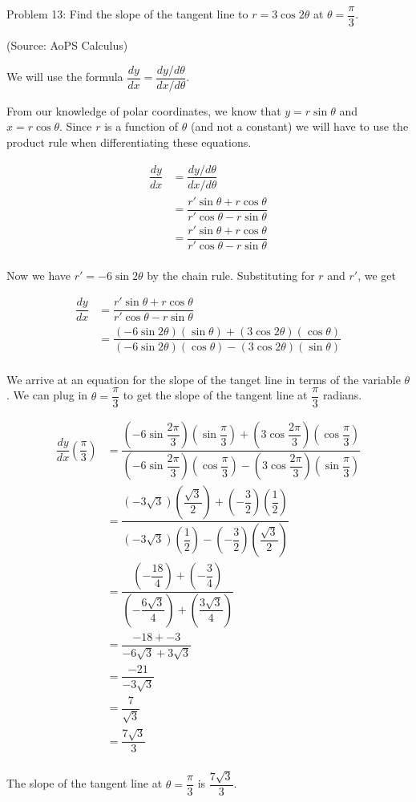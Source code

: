 Problem 13: Find the slope of the tangent line to $r = 3 \cos 2\theta$ at $\theta = \dfrac{\pi}{3}$.

(Source: AoPS Calculus)

We will use the formula $\dfrac{dy}{dx} = \dfrac{dy/d\theta}{dx/d\theta}$.

From our knowledge of polar coordinates, we know that $y = r \sin \theta$ and $x = r \cos \theta$. Since $r$ is a function of $\theta$ (and not a constant) we will have to use the product rule when differentiating these equations.

\begin{align*}
\dfrac{dy}{dx} &= \dfrac{dy/d\theta}{dx/d\theta} \\
&= \dfrac{r' \sin \theta + r \cos \theta}{r' \cos \theta - r \sin \theta} \\
&= \dfrac{r' \sin \theta + r \cos \theta}{r' \cos \theta - r \sin \theta} \\
\end{align*}

Now we have $r' = -6 \sin 2 \theta$ by the chain rule. Substituting for $r$ and $r'$, we get

\begin{align*}
\dfrac{dy}{dx} &= \dfrac{r' \sin \theta + r \cos \theta}{r' \cos \theta - r \sin \theta} \\
&= \dfrac{\left(-6 \sin 2 \theta\right)\left(\sin \theta\right) + \left(3 \cos 2\theta\right)\left(\cos \theta\right)}{\left(-6 \sin 2 \theta\right)\left(\cos \theta\right) - \left(3 \cos 2\theta\right)\left(\sin \theta\right)} \\
\end{align*}

We arrive at an equation for the slope of the tanget line in terms of the variable $\theta$. We can plug in $\theta = \dfrac{\pi}{3}$ to get the slope of the tangent line at $\dfrac{\pi}{3}$ radians.

\begin{align*}
\dfrac{dy}{dx} \left(\dfrac{\pi}{3}\right) &= \dfrac{\left(-6 \sin \dfrac{2\pi}{3}\right)\left(\sin \dfrac{\pi}{3} \right) + \left(3 \cos \dfrac{2\pi}{3}\right)\left(\cos \dfrac{\pi}{3} \right)}{\left(-6 \sin \dfrac{2\pi}{3}\right)\left(\cos \dfrac{\pi}{3}\right) - \left(3 \cos \dfrac{2\pi}{3}\right)\left(\sin \dfrac{\pi}{3}\right)} \\
&= \dfrac{\left( -3 \sqrt3 \right)\left(\dfrac{\sqrt3}{2} \right) + \left( -\dfrac{3}{2}\right)\left(\dfrac{1}{2} \right)}{\left(-3 \sqrt3\right)\left(\dfrac{1}{2}\right) - \left(-\dfrac{3}{2}\right)\left(\dfrac{\sqrt3}{2}\right)} \\
&= \dfrac{\left(-\dfrac{18}{4} \right) + \left( -\dfrac{3}{4}\right)}{\left(-\dfrac{6\sqrt3}{4}\right) + \left(\dfrac{3 \sqrt 3}{4}\right)} \\
&= \dfrac{-18 + -3}{-6\sqrt3 + 3 \sqrt 3} \\
&= \dfrac{-21}{-3\sqrt3} \\
&= \dfrac{7}{\sqrt3} \\
&= \boxed{\dfrac{7 \sqrt 3}{3}} \\
\end{align*}

The slope of the tangent line at $\theta = \dfrac{\pi}{3}$ is $\boxed{\dfrac{7 \sqrt 3}{3}}$.
